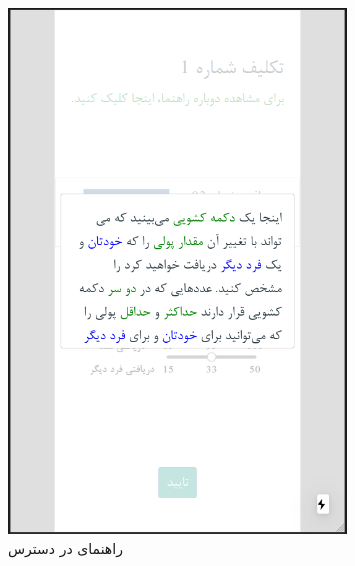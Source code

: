 \begin{figure}[htpb]
    \centering
    \includegraphics[width=0.8\textwidth]{./img/SVOPage02Instruction.png}
    \caption{راهنمای در دسترس}
    \label{fig:SVOPage02Instruction}
\end{figure}
